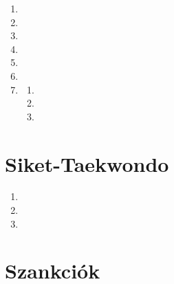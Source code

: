 \documentclass[]{report}
\begin{document}
\begin{enumerate}
\begin{enumerate}
\begin{enumerate}
        \item
        
        \item
        
        \item
        
        \item
        
        \item
        
        \item
        
        \item
        
            \begin{enumerate}
            \item
            
            \item
            
            \item
            
            \end{enumerate}
        \end{enumerate}
    \end{enumerate}
\end{enumerate}


\chapter{Siket-Taekwondo}



\begin{enumerate}
\item

\item

\item

\end{enumerate}


\chapter{Szankciók}
\end{document}
